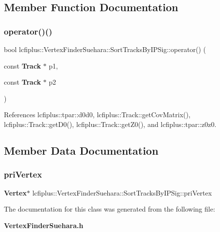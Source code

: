 \subsection{Member Function Documentation}
\mbox{\label{classlcfiplus_1_1VertexFinderSuehara_1_1SortTracksByIPSig_a39030b2d27d9cd30c9ff0fbd26efef84}} 
\subsubsection{operator()()}
{\footnotesize\ttfamily bool lcfiplus\+::\+Vertex\+Finder\+Suehara\+::\+Sort\+Tracks\+By\+I\+P\+Sig\+::operator() (\begin{DoxyParamCaption}\item[{const \textbf{ Track} $\ast$}]{p1,  }\item[{const \textbf{ Track} $\ast$}]{p2 }\end{DoxyParamCaption})\hspace{0.3cm}{\ttfamily [inline]}}



References lcfiplus\+::tpar\+::d0d0, lcfiplus\+::\+Track\+::get\+Cov\+Matrix(), lcfiplus\+::\+Track\+::get\+D0(), lcfiplus\+::\+Track\+::get\+Z0(), and lcfiplus\+::tpar\+::z0z0.



\subsection{Member Data Documentation}
\mbox{\label{classlcfiplus_1_1VertexFinderSuehara_1_1SortTracksByIPSig_aed17490dacce2c2ad8483eacc60202c8}} 
\subsubsection{pri\+Vertex}
{\footnotesize\ttfamily \textbf{ Vertex}$\ast$ lcfiplus\+::\+Vertex\+Finder\+Suehara\+::\+Sort\+Tracks\+By\+I\+P\+Sig\+::pri\+Vertex}



The documentation for this class was generated from the following file\+:\begin{DoxyCompactItemize}
\item 
\textbf{ Vertex\+Finder\+Suehara.\+h}\end{DoxyCompactItemize}

